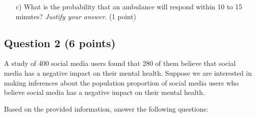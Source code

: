\documentclass{article}
\begin{document}
\begin{enumerate}
\item[c)] What is the probability that an ambulance will respond within 10 to 15 minutes? \emph{Justify your answer.} (1 point)

\begin{center}
\end{center}

\end{enumerate}

\subsection*{Question 2 (6 points)}
A study of 400 social media users found that 280 of them believe that social media has a negative impact on their mental health. Suppose we are interested in making inferences about the population proportion of social media users who believe social media has a negative impact on their mental health. 

Based on the provided information, answer the following questions:
\end{document}
